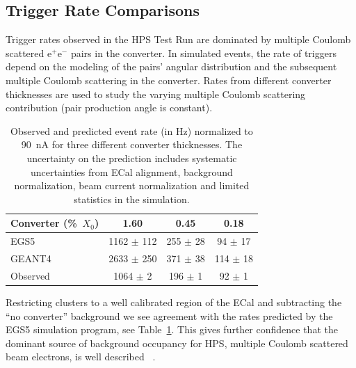 \documentclass[final,3p,times,twocolumn]{elsarticle}
\newcommand{\ee}{e$^+$e$^-$}
\newcommand{\egs}{{\sc EGS5}}
\newcommand{\moliere}{Moli\`{e}re}
\begin{document}
\subsection{Trigger Rate Comparisons}
Trigger rates observed in the HPS Test Run are dominated by multiple Coulomb scattered \ee{} pairs in the 
converter. In simulated events, the rate of triggers depend on the modeling of the pairs' angular 
distribution and the subsequent multiple Coulomb scattering in the converter. Rates from different 
converter 
thicknesses are used to study the varying multiple Coulomb scattering contribution (pair production 
angle is constant). 
\begin{table}
\label{results}
{\small
\begin{tabular}{|l|c|c|c|}
\hline
\bf Converter (\%~$X_0$) & \bf 1.60 & \bf 0.45 &	\bf 0.18 \\
\hline
EGS5 &	1162 $\pm$ 112 &	255 $\pm$ 28 &	94 $\pm$ 17	\\
\hline
GEANT4 & 2633 $\pm$ 250 & 	371 $\pm$ 38 &	114 $\pm$ 18 \\
\hline
Observed 	& 1064 $\pm$ 2 & 196 $\pm$ 1 &	92 $\pm$ 1 \\						
\hline
\end{tabular}
\caption{ Observed and predicted event rate (in Hz) normalized to 90~nA for three different converter 
thicknesses. The uncertainty on the prediction includes systematic uncertainties from ECal alignment, background normalization, beam current normalization and limited statistics in the simulation.}
}
\end{table}
Restricting clusters to a well calibrated region of the ECal and subtracting the ``no converter'' 
background we see agreement with the rates predicted by the \egs{} simulation 
program, 
see Table~\ref{results}.
This gives further confidence that the dominant source of background occupancy for HPS, multiple 
Coulomb scattered beam electrons, is well 
described~\cite{Attwood:2005zz,Shen:1978ha,Gottschalk1993467} . 
\end{document}
